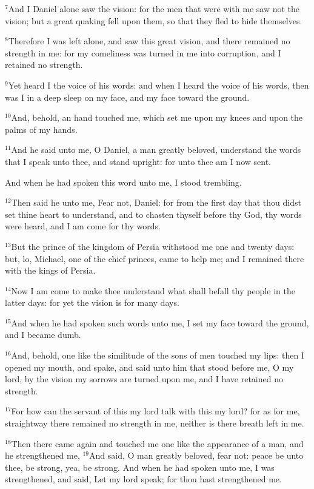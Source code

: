 \documentclass[12pt]{article}
\begin{document}
$^{7}$And I Daniel alone saw the vision: for the men that were with me
saw not the vision; but a great quaking fell upon them, so that they
fled to hide themselves.


$^{8}$Therefore I was left alone, and saw this great vision, and there
remained no strength in me: for my comeliness was turned in me into
corruption, and I retained no strength.


$^{9}$Yet heard I the voice of his words: and when I heard the voice of
his words, then was I in a deep sleep on my face, and my face toward
the ground.


$^{10}$And, behold, an hand touched me, which set me upon my knees and
upon the palms of my hands.


$^{11}$And he said unto me, O Daniel, a man greatly beloved, understand
the words that I speak unto thee, and stand upright: for unto thee am
I now sent.


And when he had spoken this word unto me, I stood trembling.


$^{12}$Then said he unto me, Fear not, Daniel: for from the first day
that thou didst set thine heart to understand, and to chasten thyself
before thy God, thy words were heard, and I am come for thy words.


$^{13}$But the prince of the kingdom of Persia withstood me one and
twenty days: but, lo, Michael, one of the chief princes, came to help
me; and I remained there with the kings of Persia.


$^{14}$Now I am come to make thee understand what shall befall thy
people in the latter days: for yet the vision is for many days.


$^{15}$And when he had spoken such words unto me, I set my face toward
the ground, and I became dumb.


$^{16}$And, behold, one like the similitude of the sons of men touched
my lips: then I opened my mouth, and spake, and said unto him that
stood before me, O my lord, by the vision my sorrows are turned upon
me, and I have retained no strength.


$^{17}$For how can the servant of this my lord talk with this my lord?
for as for me, straightway there remained no strength in me, neither
is there breath left in me.


$^{18}$Then there came again and touched me one like the appearance of
a man, and he strengthened me, $^{19}$And said, O man greatly beloved,
fear not: peace be unto thee, be strong, yea, be strong. And when he
had spoken unto me, I was strengthened, and said, Let my lord speak;
for thou hast strengthened me.
\end{document}
